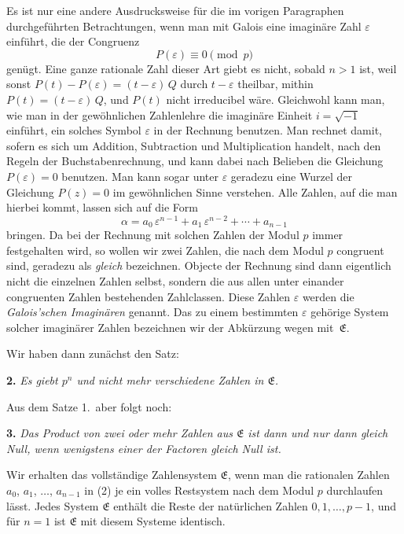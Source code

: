 \documentclass[12pt,a4paper]{article}
\begin{document}
Es ist nur eine andere Ausdrucksweise für die im vorigen Paragraphen durchgeführten Betrachtungen, wenn man mit Galois eine imaginäre Zahl $\varepsilon$ einführt, die der Congruenz
\begin{equation}\label{eq:64.1}
\tag{1}
P(\varepsilon) \equiv 0 \pmod{p}
\end{equation}
genügt. Eine ganze rationale Zahl dieser Art giebt es nicht, sobald $n > 1$ ist, weil sonst $P(t) - P(\varepsilon) = (t - \varepsilon)\,Q$ durch $t - \varepsilon$ theilbar, mithin $P(t) = (t - \varepsilon)\,Q$, und $P(t)$ nicht irreducibel wäre. Gleichwohl kann man, wie man in der gewöhnlichen Zahlenlehre die imaginäre Einheit $i = \sqrt{-1}$ einführt, ein solches Symbol $\varepsilon$ in der Rechnung benutzen. Man rechnet damit, sofern es sich um Addition, Subtraction und Multiplication handelt, nach den Regeln der Buchstabenrechnung, und kann dabei nach Belieben die Gleichung $P(\varepsilon) = 0$ benutzen. Man kann sogar unter $\varepsilon$ geradezu eine Wurzel der Gleichung $P(z) = 0$ im gewöhnlichen Sinne verstehen. Alle Zahlen, auf die man hierbei kommt, lassen sich auf die Form
\begin{equation}\label{eq:64.2}
\tag{2}
\alpha = a_{0}\,\varepsilon^{n-1} + a_{1}\,\varepsilon^{n-2} + \cdots + a_{n-1}
\end{equation}
bringen. Da bei der Rechnung mit solchen Zahlen der Modul $p$ immer festgehalten wird, so wollen wir zwei Zahlen, die nach dem Modul $p$ congruent sind, geradezu als \emph{gleich} bezeichnen. Objecte der Rechnung sind dann eigentlich nicht die einzelnen Zahlen selbst, sondern die aus allen unter einander congruenten Zahlen bestehenden Zahlclassen. Diese Zahlen $\varepsilon$ werden die \emph{Galois'schen Imaginären} genannt. Das zu einem bestimmten $\varepsilon$ gehörige System solcher imaginärer Zahlen bezeichnen wir der Abkürzung wegen mit~$\mathfrak{E}$.

Wir haben dann zunächst den Satz:

\medskip\noindent
\textbf{2.} \emph{Es giebt $p^{n}$ und nicht mehr verschiedene Zahlen in $\mathfrak{E}$.}

Aus dem Satze 1.~aber folgt noch:

\medskip\noindent
\textbf{3.} \emph{Das Product von zwei oder mehr Zahlen aus $\mathfrak{E}$ ist dann und nur dann gleich Null, wenn wenigstens einer der Factoren gleich Null ist.}

Wir erhalten das vollständige Zahlensystem $\mathfrak{E}$, wenn man die rationalen Zahlen $a_{0}$, $a_{1}$, $\ldots$, $a_{n-1}$ in (2) je ein volles Restsystem nach dem Modul $p$ durchlaufen lässt. Jedes System $\mathfrak{E}$ enthält die Reste der natürlichen Zahlen $0, 1, \ldots, p-1$, und für $n = 1$ ist $\mathfrak{E}$ mit diesem Systeme identisch.
\end{document}
